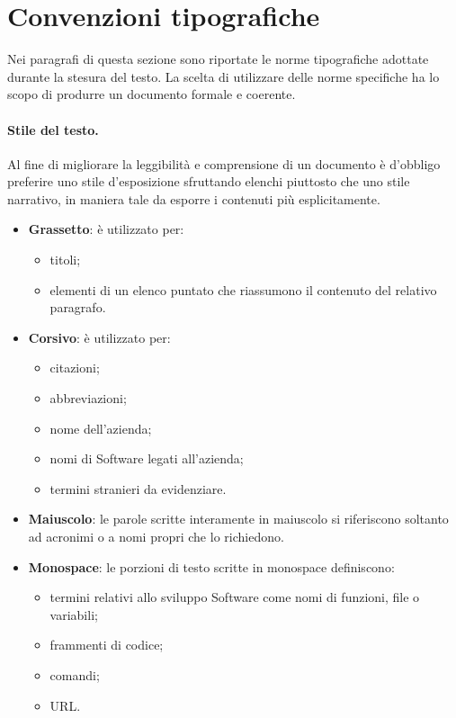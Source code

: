 \section{Convenzioni tipografiche}

Nei paragrafi di questa sezione sono riportate le norme tipografiche adottate durante la stesura del testo. La scelta di utilizzare delle norme specifiche ha lo scopo di produrre un documento formale e coerente.

\paragraph{Stile del testo.}Al fine di migliorare la leggibilità e comprensione di un documento è d'obbligo preferire uno stile d'esposizione sfruttando elenchi piuttosto che uno stile narrativo, in maniera tale da esporre i contenuti più esplicitamente.
\begin{itemize}
	\item \textbf{Grassetto}: è utilizzato per:
	\begin{itemize}
		\item titoli;
		\item elementi di un elenco puntato che riassumono il contenuto del relativo paragrafo.
	\end{itemize}
	\item \textbf{Corsivo}: è utilizzato per:
	\begin{itemize}
		\item citazioni;
		\item abbreviazioni;
		\item nome dell'azienda;
		\item nomi di Software legati all'azienda;
		\item termini stranieri da evidenziare.
	\end{itemize}
	\item \textbf{Maiuscolo}: le parole scritte interamente in maiuscolo si riferiscono soltanto ad acronimi o a nomi propri che lo richiedono.
	\item \textbf{Monospace}: le porzioni di testo scritte in monospace definiscono:
	\begin{itemize}
		\item termini relativi allo sviluppo Software come nomi di funzioni, file o variabili;
		\item frammenti di codice;
		\item comandi;
		\item \gls{URL}.
	\end{itemize}
\end{itemize}


